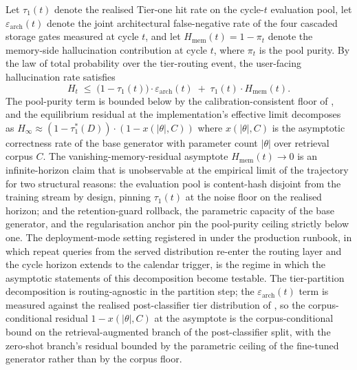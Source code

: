 \begin{remark}
\label{thm:asymptotic-elim}
Let $\tau_{1}(t)$ denote the realised Tier-one hit rate on the cycle-$t$ evaluation pool, let $\varepsilon_{\text{arch}}(t)$ denote the joint architectural false-negative rate of the four cascaded storage gates measured at cycle $t$, and let $H_{\text{mem}}(t) = 1 - \pi_{t}$ denote the memory-side hallucination contribution at cycle $t$, where $\pi_{t}$ is the pool purity. By the law of total probability over the tier-routing event, the user-facing hallucination rate satisfies
\begin{equation}
H_t \;\le\; \big(1 - \tau_{1}(t)\big) \cdot \varepsilon_{\text{arch}}(t) \;+\; \tau_{1}(t) \cdot H_{\text{mem}}(t).
\label{eq:asymptotic-elim}
\end{equation}
The pool-purity term is bounded below by the calibration-consistent floor of , and the equilibrium residual at the implementation's effective limit decomposes as $H_{\infty} \approx (1 - \tau_{1}^{*}(D)) \cdot (1 - x(\lvert\theta\rvert, C))$ where $x(\lvert\theta\rvert, C)$ is the asymptotic correctness rate of the base generator with parameter count $\lvert\theta\rvert$ over retrieval corpus $C$. The vanishing-memory-residual asymptote $H_{\text{mem}}(t) \to 0$ is an infinite-horizon claim that is unobservable at the empirical limit of the trajectory for two structural reasons: the evaluation pool is content-hash disjoint from the training stream by design, pinning $\tau_{1}(t)$ at the noise floor on the realised horizon; and the retention-guard rollback, the parametric capacity of the base generator, and the regularisation anchor pin the pool-purity ceiling strictly below one. The deployment-mode setting registered in  under the production runbook, in which repeat queries from the served distribution re-enter the routing layer and the cycle horizon extends to the calendar trigger, is the regime in which the asymptotic statements of this decomposition become testable. The tier-partition decomposition is routing-agnostic in the partition step; the $\varepsilon_{\text{arch}}(t)$ term is measured against the realised post-classifier tier distribution of , so the corpus-conditional residual $1 - x(\lvert\theta\rvert, C)$ at the asymptote is the corpus-conditional bound on the retrieval-augmented branch of the post-classifier split, with the zero-shot branch's residual bounded by the parametric ceiling of the fine-tuned generator rather than by the corpus floor.
\end{remark}

